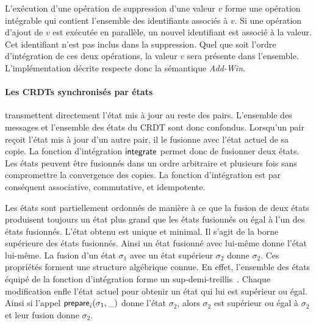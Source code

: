 
L'exécution d'une opération de suppression d'une valeur $v$ forme une opération intégrable qui contient l'ensemble des identifiants associés à $v$.
Si une opération d'ajout de $v$ est exécutée en parallèle, un nouvel identifiant est associé à la valeur.
Cet identifiant n'est pas inclus dans la suppression.
Quel que soit l'ordre d'intégration de ces deux opérations, la valeur $v$ sera présente dans l'ensemble.
L'implémentation décrite respecte donc la sémantique \emph{Add-Win}.


\paragraph{Les \acp{CRDT} synchronisés par états} transmettent directement l'état mis à jour au reste des pairs.
L'ensemble des messages et l'ensemble des états du \ac{CRDT} sont donc confondus.
Lorsqu'un pair reçoit l'état mis à jour d'un autre pair, il le fusionne avec l'état actuel de sa copie.
La fonction d'intégration $\operatorname{\mathsf{integrate}}$ permet donc de fusionner deux états.
Les états peuvent être fusionnés dans un ordre arbitraire et plusieurs fois sans compromettre la convergence des copies.
La fonction d'intégration est par conséquent associative, commutative, et idempotente.

Les états sont partiellement ordonnés de manière à ce que la fusion de deux états produisent toujours un état plus grand que les états fusionnés ou égal à l'un des états fusionnés.
L'état obtenu est unique et minimal.
Il s'agit de la borne supérieure des états fusionnés.
Ainsi un état fusionné avec lui-même donne l'état lui-même.
La fusion d'un état $\sigma_1$ avec un état supérieur $\sigma_2$ donne $\sigma_2$.
Ces propriétés forment une structure algébrique connue.
En effet, l'ensemble des états équipé de la fonction d'intégration forme un sup-demi-treillis~\autocite{davey2002lattice}.
Chaque modification enfle l'état actuel pour obtenir un état qui lui est supérieur ou égal.
Ainsi si l'appel $\operatorname{\mathsf{prepare}}_i(\sigma_1, \_)$ donne l'état $\sigma_2$, alors $\sigma_2$ est supérieur ou égal à $\sigma_2$ et leur fusion donne $\sigma_2$.

